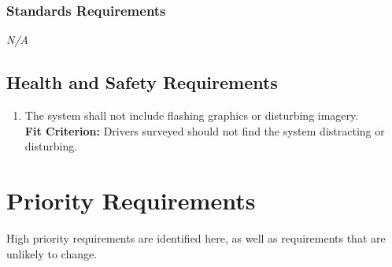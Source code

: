 \documentclass[12pt,letterpaper]{article}
\begin{document}
\subsubsection{Standards Requirements}
\noindent \emph{N/A}

\subsection{Health and Safety Requirements}
\begin{enumerate}[{HS}1.] 
    \item The system shall not include flashing graphics or disturbing
    imagery.\\
    \textbf{Fit Criterion:} Drivers surveyed should not find the system
    distracting or disturbing.
\end{enumerate}

\newpage
\section{Priority Requirements}
\label{priorityreqs}
High priority requirements are identified here, as well as requirements that are
unlikely to change.
\end{document}
